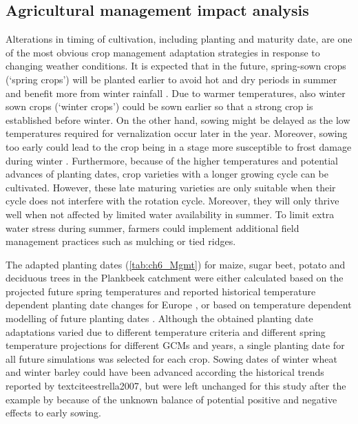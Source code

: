 \subsection{Agricultural management impact analysis} 
Alterations in timing of cultivation, including planting and maturity date, are one of the most obvious crop management adaptation strategies in response to changing weather conditions. It is expected that in the future, spring-sown crops  (`spring crops') will be planted earlier to avoid hot and dry periods in summer and benefit more from winter rainfall \parencite{olesen2011}. Due to warmer temperatures, also winter sown crops (`winter crops') could be sown earlier so that a strong crop is established before winter. On the other hand, sowing might be delayed as the low temperatures required for vernalization occur later in the year. Moreover, sowing too early could lead to the crop being in a stage more susceptible to frost damage during winter \parencite{olesen2012}. Furthermore, because of the higher temperatures and potential advances of planting dates, crop varieties with a longer growing cycle can be cultivated. However, these late maturing varieties are only suitable when their cycle does not interfere with the rotation cycle. Moreover, they will only thrive well when not affected by limited water availability in summer. To limit extra water stress during summer, farmers could implement additional field management practices such as mulching or tied ridges. 

The adapted planting dates (\autoref{tab:ch6_Mgmt}) for maize, sugar beet, potato and deciduous trees in the Plankbeek catchment were either calculated based on the projected future spring temperatures and reported historical temperature dependent planting date changes for Europe \parencite{chmielewski2004, chmielewski2001,estrella2007}, or based on temperature dependent modelling of future planting dates \parencite{vitasse2011}. Although the obtained planting date adaptations varied due to different temperature criteria and different spring temperature projections for different GCMs and years, a single planting date for all future simulations was selected for each crop. Sowing dates of winter wheat and winter barley could have been advanced according the historical trends reported by textcite{estrella2007}, but were left unchanged for this study after the example by \textcite{olesen2012} because of the unknown balance of potential positive and negative effects to early sowing.

